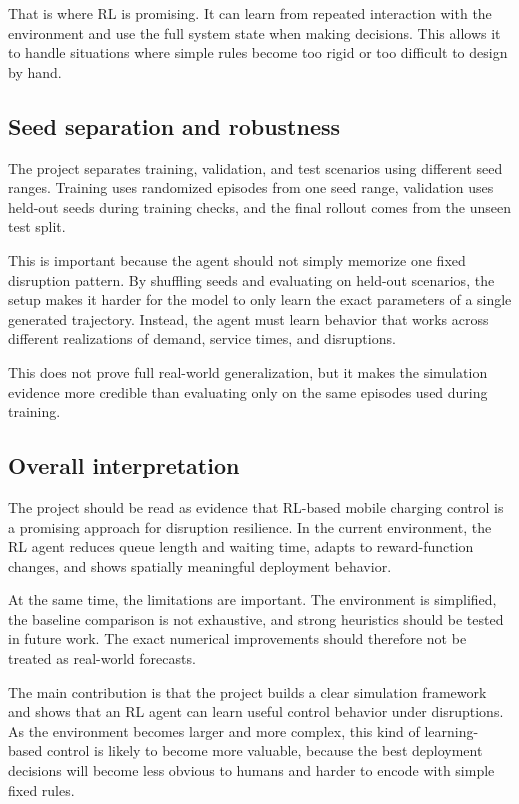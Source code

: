 \documentclass[11pt]{article}
\begin{document}
That is where RL is promising. It can learn from repeated interaction
with the environment and use the full system state when making
decisions. This allows it to handle situations where simple rules become
too rigid or too difficult to design by hand.

\subsection{Seed separation and
robustness}\label{seed-separation-and-robustness}

The project separates training, validation, and test scenarios using
different seed ranges. Training uses randomized episodes from one seed
range, validation uses held-out seeds during training checks, and the
final rollout comes from the unseen test split.

This is important because the agent should not simply memorize one fixed
disruption pattern. By shuffling seeds and evaluating on held-out
scenarios, the setup makes it harder for the model to only learn the
exact parameters of a single generated trajectory. Instead, the agent
must learn behavior that works across different realizations of demand,
service times, and disruptions.

This does not prove full real-world generalization, but it makes the
simulation evidence more credible than evaluating only on the same
episodes used during training.

\subsection{Overall interpretation}\label{overall-interpretation}

The project should be read as evidence that RL-based mobile charging
control is a promising approach for disruption resilience. In the
current environment, the RL agent reduces queue length and waiting time,
adapts to reward-function changes, and shows spatially meaningful
deployment behavior.

At the same time, the limitations are important. The environment is
simplified, the baseline comparison is not exhaustive, and strong
heuristics should be tested in future work. The exact numerical
improvements should therefore not be treated as real-world forecasts.

The main contribution is that the project builds a clear simulation
framework and shows that an RL agent can learn useful control behavior
under disruptions. As the environment becomes larger and more complex,
this kind of learning-based control is likely to become more valuable,
because the best deployment decisions will become less obvious to humans
and harder to encode with simple fixed rules.
\end{document}
